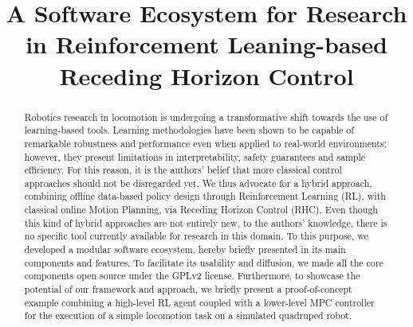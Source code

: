 \documentclass[letterpaper, 10 pt, conference]{ieeeconf}  %
\begin{document}
	
\title{\LARGE \bf
A Software Ecosystem for Research in Reinforcement Leaning-based Receding Horizon Control
}

\author{
}

\maketitle

\begingroup\renewcommand{}
\endgroup

\begingroup\renewcommand{}
\endgroup

\begingroup\renewcommand{}
\endgroup

\setlength{\textfloatsep}{12.0pt plus 8.0pt minus .0pt}

\begin{abstract}
Robotics research in locomotion is undergoing a transformative shift towards the use of learning-based tools. Learning methodologies have been shown to be capable of remarkable robustness and performance even when applied to real-world environments; however, they present limitations in interpretability, safety guarantees and sample efficiency. For this reason, it is the authors' belief that more classical control approaches should not be disregarded yet. We thus advocate for a hybrid approach, combining offline data-based policy design through Reinforcement Learning (RL), with classical online Motion Planning, via Receding Horizon Control (RHC). Even though this kind of hybrid approaches are not entirely new, to the authors' knowledge, there is no specific tool currently available for research in this domain. To this purpose, we developed a modular software ecosystem, hereby briefly presented in its main components and features. 
To facilitate its usability and diffusion, we made all the core components open source under the GPLv2 license. Furthermore, to showcase the potential of our framework and approach, we briefly present a proof-of-concept example combining a high-level RL agent coupled with a lower-level MPC controller for the execution of a simple locomotion task on a simulated quadruped robot.
\end{abstract}

\IEEEpeerreviewmaketitle


%
%






\end{document}
